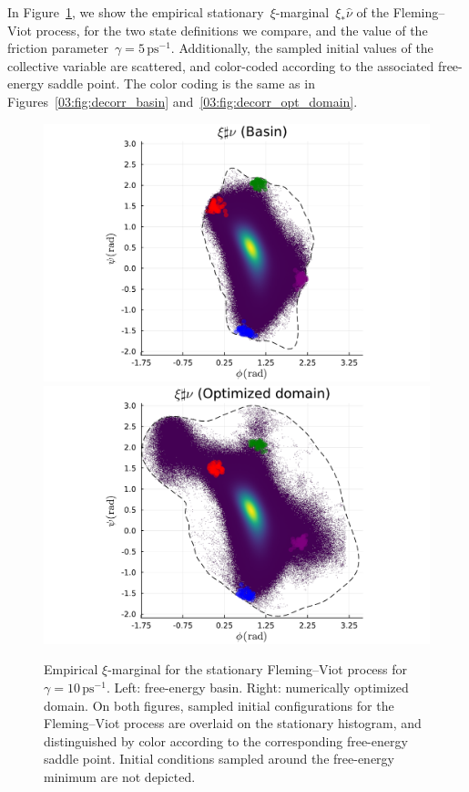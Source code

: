 In Figure~\ref{03:fig:qsds}, we show the empirical stationary~$\xi$-marginal~$\xi_*\widehat{\nu}$ of the Fleming--Viot process, for the two state definitions we compare, and the value of the friction parameter~$\gamma=5\,\mathrm{ps}^{-1}$. Additionally, the sampled initial values of the collective variable are scattered, and color-coded according to the associated free-energy saddle point. The color coding is the same as in Figures~\ref{03:fig:decorr_basin} and~\ref{03:fig:decorr_opt_domain}.
\begin{figure}
\centering
\includegraphics[width=0.49\linewidth]{figures/03/shape_optim_diala/plots_fv/histograms/qsd_phi_psi_trajectories_basin_10.pdf}
\includegraphics[width=0.49\linewidth]{figures/03/shape_optim_diala/plots_fv/histograms/qsd_phi_psi_trajectories_opt_10.pdf}
\caption[]{Empirical $\xi$-marginal for the stationary Fleming--Viot process for~$\gamma=10\,\mathrm{ps}^{-1}$. Left: free-energy basin. Right: numerically optimized domain. On both figures, sampled initial configurations for the Fleming--Viot process are overlaid on the stationary histogram, and distinguished by color according to the corresponding free-energy saddle point. Initial conditions sampled around the free-energy minimum are not depicted.}
\label{03:fig:qsds}
\end{figure}

